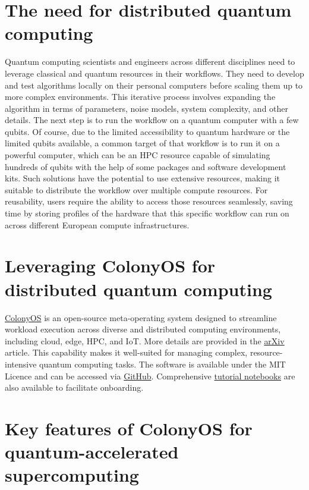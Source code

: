 \documentclass{article}
\begin{document}
\section{The need for distributed quantum computing}\label{sec:need-distributed-quantum}

Quantum computing scientists and engineers across different disciplines need to leverage classical and quantum resources in their workflows. They need to develop and test algorithms locally on their personal computers before scaling them up to more complex environments. This iterative process involves expanding the algorithm in terms of parameters, noise models, system complexity, and other details. The next step is to run the workflow on a quantum computer with a few qubits. Of course, due to the limited accessibility to quantum hardware or the limited qubits available, a common target of that workflow is to run it on a powerful computer, which can be an HPC resource capable of simulating hundreds of qubits with the help of some packages and software development kits. Such solutions have the potential to use extensive resources, making it suitable to distribute the workflow over multiple compute resources. For reusability, users require the ability to access those resources seamlessly, saving time by storing profiles of the hardware that this specific workflow can run on across different European compute infrastructures.

\section{Leveraging ColonyOS for distributed quantum computing}\label{sec:leveraging-colonyos}

\href{https://colonyos.io/}{ColonyOS} is an open-source meta-operating system designed to streamline workload execution across diverse and distributed computing environments, including cloud, edge, HPC, and IoT. More details are provided in the \href{https://ar5iv.labs.arxiv.org/html/2403.16486}{arXiv} article. This capability makes it well-suited for managing complex, resource-intensive quantum computing tasks. The software is available under the MIT Licence and can be accessed via \href{https://github.com/colonyos}{GitHub}. Comprehensive \href{https://github.com/colonyos/tutorials}{tutorial notebooks} are also available to facilitate onboarding.

\section{Key features of ColonyOS for quantum-accelerated supercomputing}\label{sec:key-features}
\end{document}
